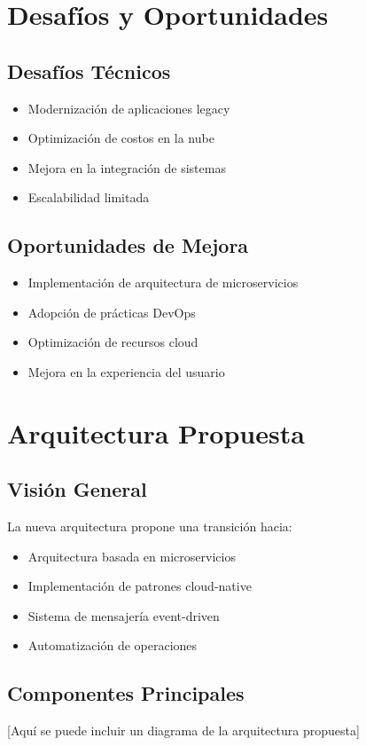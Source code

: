 \section{Desafíos y Oportunidades}
\subsection{Desafíos Técnicos}
\begin{itemize}
    \item Modernización de aplicaciones legacy
    \item Optimización de costos en la nube
    \item Mejora en la integración de sistemas
    \item Escalabilidad limitada
\end{itemize}

\subsection{Oportunidades de Mejora}
\begin{itemize}
    \item Implementación de arquitectura de microservicios
    \item Adopción de prácticas DevOps
    \item Optimización de recursos cloud
    \item Mejora en la experiencia del usuario
\end{itemize}

\section{Arquitectura Propuesta}
\subsection{Visión General}
La nueva arquitectura propone una transición hacia:
\begin{itemize}
    \item Arquitectura basada en microservicios
    \item Implementación de patrones cloud-native
    \item Sistema de mensajería event-driven
    \item Automatización de operaciones
\end{itemize}

\subsection{Componentes Principales}
[Aquí se puede incluir un diagrama de la arquitectura propuesta]

